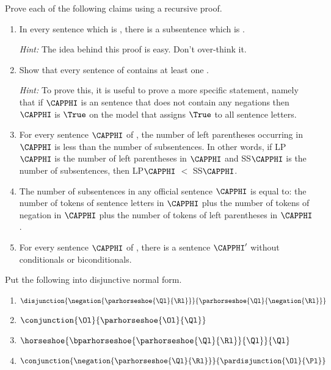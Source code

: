 Prove each of the following claims using a recursive proof. 
\begin{enumerate}
\item In every \GSL{} sentence which is , there is a subsentence which is .
\begin{commentary}
	\emph{Hint:} The idea behind this proof is easy. Don't over-think it. 	
\end{commentary}

\item Show that every  sentence of \GSL{} contains at least one \mention{$\NEGATION$}.
\begin{commentary}
	\emph{Hint:}
	To prove this, it is useful to prove a more specific statement, namely that if $\CAPPHI$ is an \GSL{} sentence that does not contain any negations then $\CAPPHI$ is $\True$ on the model that assigns $\True$ to all sentence letters.
\end{commentary}

\item For every sentence $\CAPPHI$ of \GSL{}, the number of left parentheses occurring in $\CAPPHI$ is less than the number of subsentences. In other words, if LP$\CAPPHI$ is the number of left parentheses in $\CAPPHI$ and SS$\CAPPHI$ is the number of subsentences, then LP$\CAPPHI$ $<$ SS$\CAPPHI$.
\item The number of subsentences in any official \GSL{} sentence $\CAPPHI$ is equal to: the number of tokens of sentence letters in $\CAPPHI$ plus the number of tokens of negation in $\CAPPHI$ plus the number of tokens of left parentheses in $\CAPPHI$.
\item For every sentence $\CAPPHI$ of \GSL{}, there is a  sentence $\CAPPHI'$ without conditionals or biconditionals.
\end{enumerate}

Put the following into disjunctive normal form.
\begin{multicols}{2}
\begin{enumerate}
\item {$\disjunction{\negation{\parhorseshoe{\Ql}{\Rl}}}{\parhorseshoe{\Ql}{\negation{\Rl}}}$}
\item {$\conjunction{\Ol}{\parhorseshoe{\Ol}{\Ql}}$}
\item {$\horseshoe{\bparhorseshoe{\parhorseshoe{\Ql}{\Rl}}{\Ql}}{\Ql}$}
\item {$\conjunction{\negation{\parhorseshoe{\Ql}{\Rl}}}{\pardisjunction{\Ol}{\Pl}}$}
\end{enumerate}
\end{multicols}



